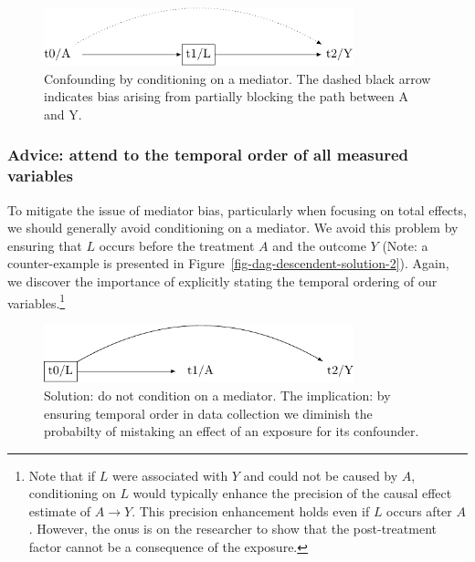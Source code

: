 \documentclass[
  singlecolumn]{article}
\begin{document}
\begin{figure}

{\centering \includegraphics[width=0.8\textwidth,height=\textheight]{causal-dags_files/figure-pdf/fig-dag-mediator-1.pdf}

}

\caption{\label{fig-dag-mediator}Confounding by conditioning on a
mediator. The dashed black arrow indicates bias arising from partially
blocking the path between A and Y.}

\end{figure}

\hypertarget{advice-attend-to-the-temporal-order-of-all-measured-variables-2}{%
\subsubsection{Advice: attend to the temporal order of all measured
variables}\label{advice-attend-to-the-temporal-order-of-all-measured-variables-2}}

To mitigate the issue of mediator bias, particularly when focusing on
total effects, we should generally avoid conditioning on a mediator. We
avoid this problem by ensuring that \(L\) occurs before the treatment
\(A\) and the outcome \(Y\) (Note: a counter-example is presented in
Figure~\ref{fig-dag-descendent-solution-2}). Again, we discover the
importance of explicitly stating the temporal ordering of our
variables.\footnote{Note that if \(L\) were associated with \(Y\) and
  could not be caused by \(A\), conditioning on \(L\) would typically
  enhance the precision of the causal effect estimate of \(A \to Y\).
  This precision enhancement holds even if \(L\) occurs after \(A\).
  However, the onus is on the researcher to show that the post-treatment
  factor cannot be a consequence of the exposure.}

\begin{figure}

{\centering \includegraphics[width=0.8\textwidth,height=\textheight]{causal-dags_files/figure-pdf/fig-dag-mediator-solution-1.pdf}

}

\caption{\label{fig-dag-mediator-solution}Solution: do not condition on
a mediator. The implication: by ensuring temporal order in data
collection we diminish the probabilty of mistaking an effect of an
exposure for its confounder.}

\end{figure}
\end{document}
